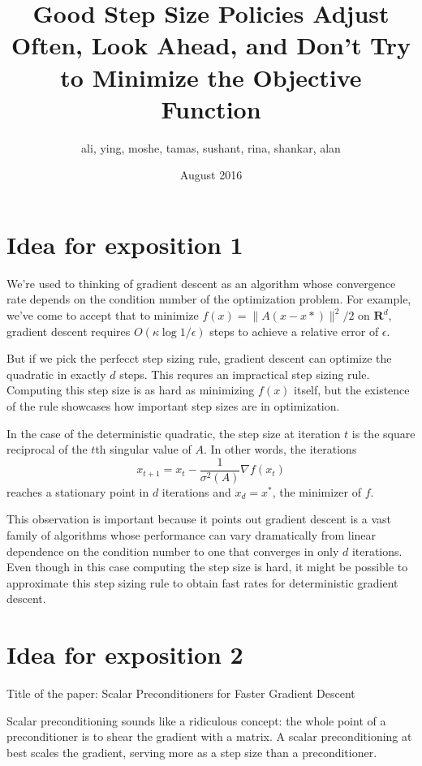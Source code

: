 \documentclass{article}
\title{Good Step Size Policies Adjust Often, Look Ahead, and Don't Try to Minimize the Objective Function}
\author{ali, ying, moshe, tamas, sushant, rina, shankar, alan}
\date{August 2016}
\newcommand{\R}{\mathbf{R}}
\begin{document}
\maketitle

\section{Idea for exposition 1}

We're used to thinking of gradient descent as an algorithm whose convergence rate depends on the condition number of the
optimization problem. For example, we've come to accept that to minimize $f(x) = \|A (x-x*)\|^2/2$ on $\R^d$, gradient
descent requires $O(\kappa \log 1/\epsilon)$ steps to achieve a relative error of $\epsilon$.

But if we pick the perfecct step sizing rule, gradient descent can optimize the
quadratic in exactly $d$ steps. This requres an impractical step sizing rule.
Computing this step size is as hard as minimizing $f(x)$ itself, but the
existence of the rule showcases how important step sizes are in optimization.

In the case of the deterministic quadratic, the step size at iteration $t$ is the square reciprocal of the $t$th singular value of $A$. In other words, the iterations
\[
        x_{t+1} = x_t - \frac{1}{\sigma^2(A)} \nabla f(x_t)
\]
reaches a stationary point in $d$ iterations and $x_d = x^*$, the minimizer of $f$.

This observation is important because it points out gradient descent is a vast family of algorithms whose performance can vary dramatically from linear dependence on the condition number to one that converges in only $d$ iterations. Even though in this case computing the step size is hard, it might be possible to approximate this step sizing rule to obtain fast rates for deterministic gradient descent.


\section{Idea for exposition 2}

Title of the paper: Scalar Preconditioners for Faster Gradient Descent

Scalar preconditioning sounds like a ridiculous concept: the whole point of a preconditioner is to shear the gradient with a matrix. A scalar preconditioning at best scales the gradient, serving more as a step size than a preconditioner.
\end{document}
